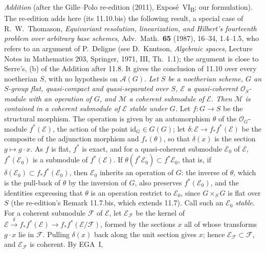 
\medskip
{}\label{prop:sga3-VIB-11.10.bis}%
\noindent
\emph{Addition} (after the Gille--Polo re-edition (2011), Expos\'e~VI\textsubscript{B}; our formulation).
The re-edition adds here (its 11.10.bis) the following result, a special case of R.~W.~Thomason,
\emph{Equivariant resolution, linearization, and Hilbert's fourteenth problem over arbitrary base schemes},
Adv.\ Math.\ \textbf{65} (1987), 16--34, 1.4--1.5, who refers to an argument of P.~Deligne (see D.~Knutson,
\emph{Algebraic spaces}, Lecture Notes in Mathematics 203, Springer, 1971, III, Th.~1.1); the argument is close to
Serre's, (b) of the Addition after 11.8. It gives the conclusion of 11.10 over every noetherian \(S\), with no
hypothesis on \(\mathcal A(G)\). \emph{Let \(S\) be a noetherian scheme, \(G\) an \(S\)-group flat, quasi-compact
and quasi-separated over \(S\), \(\mathcal E\) a quasi-coherent \(\mathcal O_S\)-module with an operation of \(G\),
and \(\mathcal M\) a coherent submodule of \(\mathcal E\). Then \(\mathcal M\) is contained in a coherent submodule
of \(\mathcal E\) stable under \(G\).}
Let \(f\colon G\to S\) be the structural morphism. The operation is given by an automorphism \(\theta\) of the
\(\mathcal O_G\)-module \(f^*(\mathcal E)\), the action of the point \(\mathrm{id}_G\in G(G)\); let
\(\delta\colon\mathcal E\to f_*f^*(\mathcal E)\) be the composite of the adjunction morphism and \(f_*(\theta)\), so
that \(\delta(x)\) is the section \(g\mapsto g\cdot x\). As \(f\) is flat, \(f^*\) is exact, and for a
quasi-coherent submodule \(\mathcal E_0\) of \(\mathcal E\), \(f^*(\mathcal E_0)\) is a submodule of
\(f^*(\mathcal E)\). If \(\theta(f^*\mathcal E_0)\subset f^*\mathcal E_0\), that is, if
\(\delta(\mathcal E_0)\subset f_*f^*(\mathcal E_0)\), then \(\mathcal E_0\) inherits an operation of \(G\): the
inverse of \(\theta\), which is the pull-back of \(\theta\) by the inversion of \(G\), also preserves
\(f^*(\mathcal E_0)\), and the identities expressing that \(\theta\) is an operation restrict to \(\mathcal E_0\),
since \(G\times_SG\) is flat over \(S\) (the re-edition's Remark 11.7.bis, which extends 11.7). Call such an
\(\mathcal E_0\) \emph{stable}. For a coherent submodule \(\mathcal F\) of \(\mathcal E\), let
\(\mathcal E_{\mathcal F}\) be the kernel of
\(\mathcal E\xrightarrow{\delta}f_*f^*(\mathcal E)\to f_*f^*(\mathcal E/\mathcal F)\), formed by the sections \(x\)
all of whose transforms \(g\cdot x\) lie in \(\mathcal F\). Pulling \(\delta(x)\) back along the unit section gives
\(x\); hence \(\mathcal E_{\mathcal F}\subset\mathcal F\), and \(\mathcal E_{\mathcal F}\) is coherent. By EGA~I,
